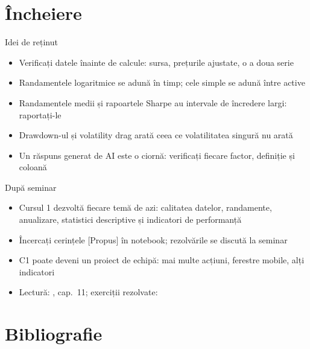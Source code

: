 \section{Încheiere}

\begin{frame}{Idei de reținut}
\itemsize{\small}
\begin{itemize}
    \item Verificați datele înainte de calcule: sursa, prețurile ajustate, o a doua serie
    \item Randamentele logaritmice se adună în timp; cele simple se adună între active
    \item Randamentele medii și rapoartele Sharpe au intervale de încredere largi: raportați-le
    \item Drawdown-ul și volatility drag arată ceea ce volatilitatea singură nu arată
    \item Un răspuns generat de AI este o ciornă: verificați fiecare factor, definiție și coloană
\end{itemize}
\end{frame}

\begin{frame}{După seminar}
\itemsize{\small}
\begin{itemize}
    \item Cursul 1 dezvoltă fiecare temă de azi: calitatea datelor, randamente, anualizare, statistici descriptive și indicatori de performanță
    \item Încercați cerințele [Propus] în notebook; rezolvările se discută la seminar
    \item C1 poate deveni un proiect de echipă: mai multe acțiuni, ferestre mobile, alți indicatori
    \item Lectură: , cap.~11; exerciții rezolvate: 
\end{itemize}
\end{frame}


\section{Bibliografie}

